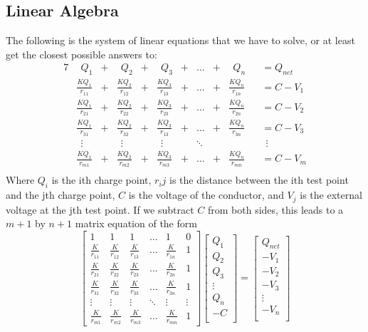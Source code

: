 \documentclass{article}
\begin{document}
\subsection{Linear Algebra}
The following is the system of linear equations that we have to solve, or at least get the closest possible answers to:
\begin{alignat*}{7}
    &\ \ Q_1&+&\ \ Q_2 &+&\ \ Q_3 &+& \ldots &+&\ \ Q_n &&= Q_{net}\\
    &\frac{KQ_1}{r_{11}} &+& \frac{KQ_2}{r_{12}} &+& \frac{KQ_3}{r_{13}} &+&\ldots &+& \frac{KQ_n}{r_{1n}} &&= C-V_1\\
    &\frac{KQ_1}{r_{21}} &+& \frac{KQ_2}{r_{22}} &+& \frac{KQ_3}{r_{23}} &+&\ldots &+& \frac{KQ_n}{r_{2n}} &&= C-V_2\\
    &\frac{KQ_1}{r_{31}} &+& \frac{KQ_2}{r_{32}} &+& \frac{KQ_3}{r_{13}} &+&\ldots &+& \frac{KQ_n}{r_{3n}} &&= C-V_3\\
    &\ \ \vdots& & \ \ \vdots & & \ \ \vdots & & \ddots & & &&\ \ \vdots\\
    &\frac{KQ_1}{r_{m1}} &+& \frac{KQ_2}{r_{m2}} &+& \frac{KQ_3}{r_{m3}} &+&\ldots &+& \frac{KQ_n}{r_{mn}} &&= C-V_m\\
\end{alignat*}
Where $Q_i$ is the ith charge point, $r_ij$ is the distance between the ith test point and the jth charge point, $C$ is the voltage of the conductor, and $V_j$ is the external voltage at the jth test point.
If we subtract $C$ from both sides, this leads to a $m+1$ by $n+1$ matrix equation of the form
\begin{equation*}
\begin{bmatrix}
1 & 1 & 1 &\ldots& 1 & 0\\
\frac{K}{r_{11}} & \frac{K}{r_{12}} & \frac{K}{r_{13}} &\ldots& \frac{K}{r_{1n}} & 1\\
\frac{K}{r_{21}} & \frac{K}{r_{22}} & \frac{K}{r_{23}} &\ldots& \frac{K}{r_{2n}} & 1\\
\frac{K}{r_{31}} & \frac{K}{r_{32}} & \frac{K}{r_{33}} &\ldots& \frac{K}{r_{3n}} & 1\\
\vdots &\vdots & \vdots &\ddots& \vdots & \vdots\\
\frac{K}{r_{m1}} & \frac{K}{r_{m2}} & \frac{K}{r_{m3}} &\ldots& \frac{K}{r_{mn}} & 1
\end{bmatrix}
\begin{bmatrix}
    Q_1\\
    Q_2\\
    Q_3\\
    \vdots\\
    Q_n\\
    -C\\
\end{bmatrix}
=
\begin{bmatrix}
    Q_{net}\\
    -V_1\\
    -V_2\\
    -V_3\\
    \vdots\\
    -V_n\\
\end{bmatrix}
\end{equation*}
\end{document}
